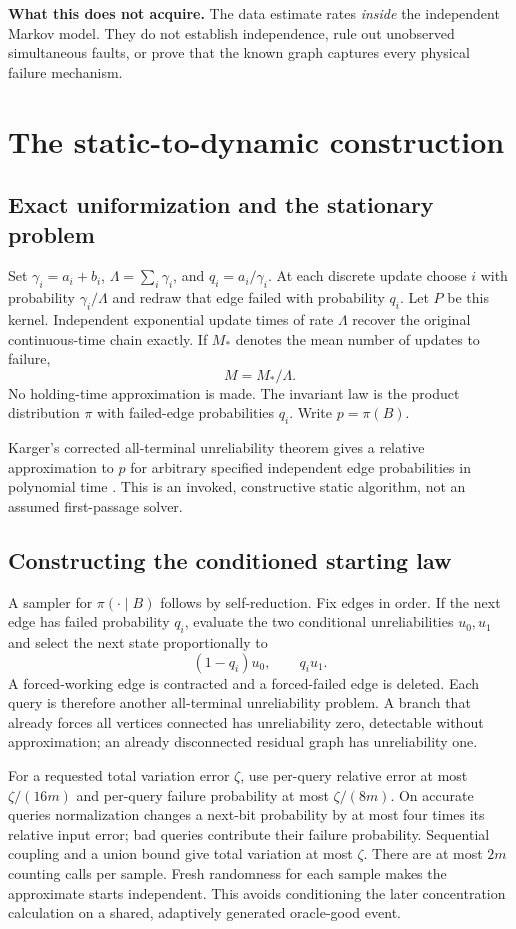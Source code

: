 \documentclass[11pt,a4paper]{article}
\begin{document}
\textbf{What this does not acquire.} The data estimate rates \emph{inside} the independent Markov model. They do not establish independence, rule out unobserved simultaneous faults, or prove that the known graph captures every physical failure mechanism.

\section{The static-to-dynamic construction}
\subsection{Exact uniformization and the stationary problem}
Set $\gamma_i=a_i+b_i$, $\Lambda=\sum_i\gamma_i$, and $q_i=a_i/\gamma_i$. At each discrete update choose $i$ with probability $\gamma_i/\Lambda$ and redraw that edge failed with probability $q_i$. Let $P$ be this kernel. Independent exponential update times of rate $\Lambda$ recover the original continuous-time chain exactly. If $M_*$ denotes the mean number of updates to failure,
\begin{equation}
 M=M_*/\Lambda.\label{eq:uniform}
\end{equation}
No holding-time approximation is made. The invariant law is the product distribution $\pi$ with failed-edge probabilities $q_i$. Write $p=\pi(B)$.

Karger's corrected all-terminal unreliability theorem gives a relative approximation to $p$ for arbitrary specified independent edge probabilities in polynomial time \cite{karger}. This is an invoked, constructive static algorithm, not an assumed first-passage solver.

\subsection{Constructing the conditioned starting law}
A sampler for $\pi(\cdot\mid B)$ follows by self-reduction. Fix edges in order. If the next edge has failed probability $q_i$, evaluate the two conditional unreliabilities $u_0,u_1$ and select the next state proportionally to
\[
 (1-q_i)u_0,\qquad q_i u_1.
\]
A forced-working edge is contracted and a forced-failed edge is deleted. Each query is therefore another all-terminal unreliability problem. A branch that already forces all vertices connected has unreliability zero, detectable without approximation; an already disconnected residual graph has unreliability one.

For a requested total variation error $\zeta$, use per-query relative error at most $\zeta/(16m)$ and per-query failure probability at most $\zeta/(8m)$. On accurate queries normalization changes a next-bit probability by at most four times its relative input error; bad queries contribute their failure probability. Sequential coupling and a union bound give total variation at most $\zeta$. There are at most $2m$ counting calls per sample. Fresh randomness for each sample makes the approximate starts independent. This avoids conditioning the later concentration calculation on a shared, adaptively generated oracle-good event.
\end{document}
